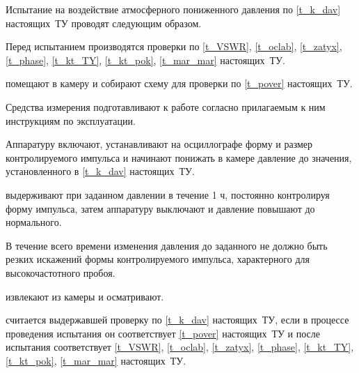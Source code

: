 Испытание на воздействие атмосферного пониженного давления по \ref{t_k_dav} настоящих~ТУ проводят следующим образом.

Перед испытанием производятся проверки \dut по \ref{t_VSWR}, \ref{t_oclab}, \ref{t_zatyx},  \ref{t_phase}, \ref{t_kt_TY}, \ref{t_kt_pok}, \ref{t_mar_mar} настоящих~ТУ.

\dut помещают в камеру и собирают схему для проверки по \ref{t_pover} настоящих~ТУ. 

Средства измерения подготавливают к работе согласно прилагаемым к ним инструкциям по эксплуатации.

Аппаратуру включают, устанавливают на осциллографе форму и размер контролируемого импульса и начинают понижать в камере давление до значения, установленного в \ref{t_k_dav} настоящих~ТУ.  

\dut выдерживают при заданном давлении в течение 1 ч, постоянно контролируя форму импульса, затем аппаратуру выключают и давление повышают до нормального. 

В течение всего времени изменения давления до заданного не должно быть резких искажений формы контролируемого импульса, характерного для высокочастотного пробоя.

\dut извлекают из камеры и осматривают.

\dut считается выдержавшей проверку по \ref{t_k_dav} настоящих~ТУ, если в процессе проведения испытания он соответствует \ref{t_pover} настоящих~ТУ и после испытания \dut соответствует \ref{t_VSWR}, \ref{t_oclab}, \ref{t_zatyx},  \ref{t_phase}, \ref{t_kt_TY}, \ref{t_kt_pok}, \ref{t_mar_mar} настоящих~ТУ.